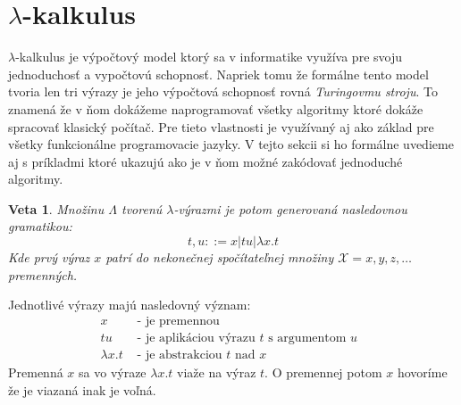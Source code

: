 \documentclass[a4paper,10pt,oneside]{report}%
\newtheorem{theorem}{Veta}[chapter]
\begin{document}

\section{$\lambda$-kalkulus}
    $\lambda$-kalkulus je výpočtový model ktorý sa v informatike využíva pre svoju
jednoduchosť a vypočtovú schopnosť.
    Napriek tomu že formálne tento model tvoria len tri výrazy je jeho výpočtová
schopnosť rovná \emph{Turingovmu stroju}.
    To znamená že v ňom dokážeme naprogramovať všetky algoritmy ktoré dokáže
spracovať klasický počítač.
    Pre tieto vlastnosti je využívaný aj ako základ pre všetky funkcionálne programovacie
jazyky.
    V tejto sekcii si ho formálne uvedieme aj s príkladmi ktoré ukazujú ako je
v ňom možné zakódovať jednoduché algoritmy.

\begin{theorem}
    Množinu $\Lambda$ tvorenú $\lambda$-výrazmi je potom generovaná nasledovnou gramatikou:
    \begin{equation}
        t, u ::= x | t u | \lambda x.t
    \end{equation}
    Kde prvý výraz $x$ patrí do nekonečnej spočítateľnej množiny $\mathcal{X}={x,y,z,\dots}$
premenných.
\end{theorem}
    Jednotlivé výrazy majú nasledovný význam:
\begin{align*}
     x          & \textrm{ - je premennou }\\
     t u        & \textrm{ - je aplikáciou výrazu $t$ s argumentom $u$ }\\
    \lambda x.t & \textrm{ - je abstrakciou $t$ nad $x$ }
\end{align*}
    Premenná $x$ sa vo výraze $\lambda x . t$ viaže na výraz $t$. O premennej potom
$x$ hovoríme že je viazaná inak je voľná.
\end{document}

